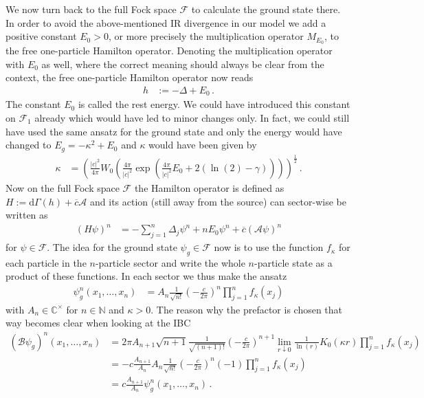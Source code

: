 We now turn back to the full Fock space $\mathcal{F}$ to calculate the ground state there. In order to avoid the above-mentioned IR divergence in our model we add a positive constant $E_{0} > 0$, or more precisely the multiplication operator $M_{E_{0}}$, to the free one-particle Hamilton operator. Denoting the multiplication operator with $E_{0}$ as well, where the correct meaning should always be clear from the context, the free one-particle Hamilton operator now reads
\begin{align*}
  h
  &:=
  -
  \Delta
  +
  E_{0}
  \,.
\end{align*}
The constant $E_{0}$ is called the rest energy. We could have introduced this constant on $\mathcal{F}_{1}$ already which would have led to minor changes only. In fact, we could still have used the same ansatz for the ground state and only the energy would have changed to $E_{g} = -\kappa^{2} + E_{0}$ and $\kappa$ would have been given by
\begin{align*}
  \kappa
  &=
  \left(
    \frac{\vert c \vert^{2}}{4\pi}
    W_{0}
    \left(
      \frac{4\pi}{\vert c \vert^{2}}
      \exp
      \left(
        \frac{4\pi}{\vert c \vert^{2}}
        E_{0}
        +
        2(\ln(2) - \gamma)
      \right)
    \right)
  \right)^{\frac{1}{2}}
  \,.
\end{align*}
Now on the full Fock space $\mathcal{F}$ the Hamilton operator is defined as $H := \mathrm{d}\Gamma(h) + \overline{c}\mathcal{A}$ and its action (still away from the source) can sector-wise be written as
\begin{align*}
  (H\psi)^{n}
  &=
  -
  \sum_{j = 1}^{n}
  \Delta_{j}
  \psi^{n}
  +
  nE_{0}
  \psi^{n}
  +
  \overline{c}
  (\mathcal{A}\psi)^{n}
\end{align*}
for $\psi \in \mathcal{F}$. The idea for the ground state $\psi_{g} \in \mathcal{F}$ now is to use the function $f_{\kappa}$ for each particle in the $n$-particle sector and write the whole $n$-particle state as a product of these functions. In each sector we thus make the ansatz
\begin{align*}
  \psi_{g}^{n}
  \left(
    x_{1}
    ,
    \dots
    ,
    x_{n}
  \right)
  &=
  A_{n}
  \frac{1}{\sqrt{n!}}
  \left(
    -
    \frac{c}{2\pi}
  \right)^{n}
  \prod_{j = 1}^{n}
  f_{\kappa}(x_{j})
\end{align*}
with $A_{n} \in \mathbb{C}^{\times}$ for $n \in \mathbb{N}$ and $\kappa > 0$. The reason why the prefactor is chosen that way becomes clear when looking at the IBC
\begin{align*}
  \left(
    \mathcal{B}
    \psi_{g}
  \right)^{n}
  \left(
    x_{1}
    ,
    \dots
    ,
    x_{n}
  \right)
  &=
  2\pi
  A_{n + 1}
  \sqrt{n + 1}
  \frac{1}{\sqrt{(n + 1)!}}
  \left(
    -
    \frac{c}{2\pi}
  \right)^{n + 1}
  \lim_{r \downarrow 0}
  \frac{1}{\ln(r)}
  K_{0}(\kappa r)
  \prod_{j = 1}^{n}
  f_{\kappa}(x_{j})
  \\
  &=
  -
  c
  \frac{A_{n + 1}}{A_{n}}
  A_{n}
  \frac{1}{\sqrt{n!}}
  \left(
    -
    \frac{c}{2\pi}
  \right)^{n}
  (-1)
  \prod_{j = 1}^{n}
  f_{\kappa}(x_{j})
  \\
  &=
  c
  \frac{A_{n + 1}}{A_{n}}
  \psi_{g}^{n}
  \left(
    x_{1}
    ,
    \dots
    ,
    x_{n}
  \right)
  \,.
\end{align*}
